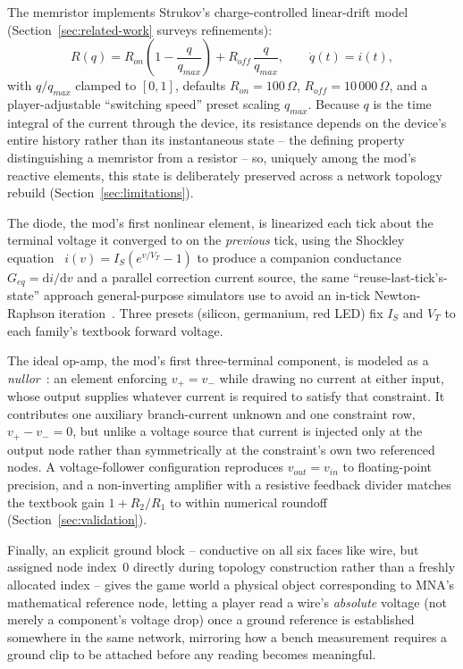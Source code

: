 The memristor implements Strukov's charge-controlled linear-drift
model~\cite{strukov2008missing} (Section~\ref{sec:related-work} surveys refinements):
\begin{equation}
R(q) = R_{on}\left(1 - \frac{q}{q_{max}}\right) + R_{off}\,\frac{q}{q_{max}}, \qquad
\dot{q}(t) = i(t),
\end{equation}
with $q/q_{max}$ clamped to $[0,1]$, defaults $R_{on}=100\,\Omega$, $R_{off}=10\,000\,\Omega$,
and a player-adjustable ``switching speed'' preset scaling $q_{max}$. Because $q$ is the time
integral of the current through the device, its resistance depends on the device's entire
history rather than its instantaneous state -- the defining property distinguishing a
memristor from a resistor -- so, uniquely among the mod's reactive elements, this state is
deliberately preserved across a network topology rebuild (Section~\ref{sec:limitations}).

The diode, the mod's first nonlinear element, is linearized each tick about the terminal
voltage it converged to on the \emph{previous} tick, using the Shockley
equation~\cite{shockley1949diode} $i(v)=I_S(e^{v/V_T}-1)$ to produce a companion conductance
$G_{eq}=\mathrm{d}i/\mathrm{d}v$ and a parallel correction current source, the same
``reuse-last-tick's-state'' approach general-purpose simulators use to avoid an
in-tick Newton-Raphson iteration~\cite{massobrio1993spice}. Three presets (silicon,
germanium, red LED) fix $I_S$ and $V_T$ to each family's textbook forward voltage.

The ideal op-amp, the mod's first three-terminal component, is modeled as a
\emph{nullor}~\cite{chualin1975nullor}: an element enforcing $v_{+}=v_{-}$ while drawing no
current at either input, whose output supplies whatever current is required to satisfy that
constraint. It contributes one auxiliary branch-current unknown and one constraint row,
$v_{+}-v_{-}=0$, but unlike a voltage source that current is injected only at the output node
rather than symmetrically at the constraint's own two referenced nodes. A voltage-follower
configuration reproduces $v_{out}=v_{in}$ to floating-point precision, and a non-inverting
amplifier with a resistive feedback divider matches the textbook gain $1+R_2/R_1$ to within
numerical roundoff (Section~\ref{sec:validation}).

Finally, an explicit ground block -- conductive on all six faces like wire, but assigned node
index~0 directly during topology construction rather than a freshly allocated index -- gives
the game world a physical object corresponding to MNA's mathematical reference node, letting a
player read a wire's \emph{absolute} voltage (not merely a component's voltage drop) once a
ground reference is established somewhere in the same network, mirroring how a bench
measurement requires a ground clip to be attached before any reading becomes meaningful.
